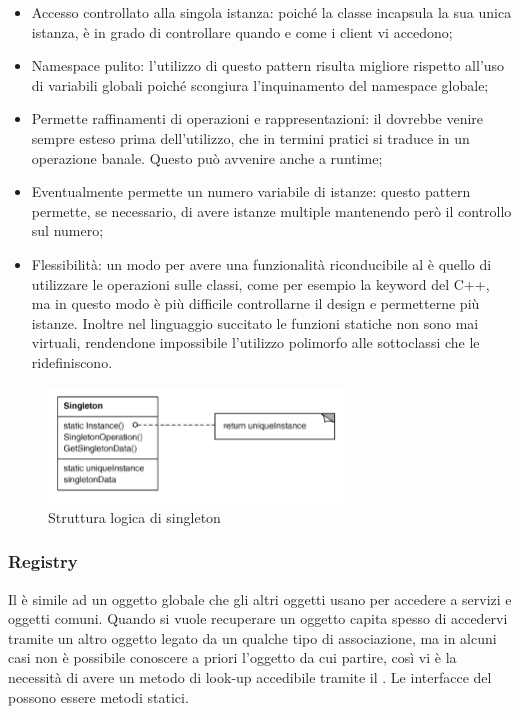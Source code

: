 \begin{itemize}

	\item Accesso controllato alla singola istanza: poiché la classe  incapsula la sua unica istanza, è in grado di controllare quando e come i client vi accedono;
	\item Namespace pulito: l'utilizzo di questo pattern risulta migliore rispetto all'uso di variabili globali poiché scongiura l'inquinamento del namespace globale;
	\item Permette raffinamenti di operazioni e rappresentazioni: il  dovrebbe venire sempre esteso prima dell'utilizzo, che in termini pratici si traduce in un operazione banale. Questo può avvenire anche a runtime;
	\item Eventualmente permette un numero variabile di istanze: questo pattern permette, se necessario, di avere istanze multiple mantenendo però il controllo sul numero;
	\item Flessibilità: un modo per avere una funzionalità riconducibile al  è quello di utilizzare le operazioni sulle classi, come per esempio la keyword  del C++, ma in questo modo è più difficile controllarne il design e permetterne più istanze. Inoltre nel linguaggio succitato le funzioni statiche non sono mai virtuali, rendendone impossibile l'utilizzo polimorfo alle sottoclassi che le ridefiniscono.
	
\end{itemize}

\begin{figure}[h]
\centering \includegraphics[width=0.7\textwidth]{patterns/Singleton.png}
\caption{Struttura logica di singleton}
\end{figure}

\subsubsection{Registry} %

Il  è simile ad un oggetto globale che gli altri oggetti usano per accedere a servizi e oggetti comuni. Quando si vuole recuperare un oggetto capita spesso di accedervi tramite un altro oggetto legato da un qualche tipo di associazione, ma in alcuni casi non è possibile conoscere a priori l'oggetto da cui partire, così vi è la necessità di avere un metodo di look-up accedibile tramite il . Le interfacce del  possono essere metodi statici.

